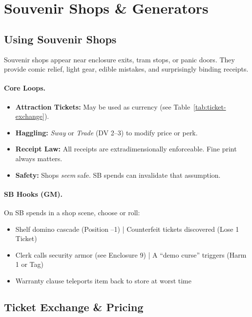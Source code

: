 \section{Souvenir Shops \& Generators}
\label{sec:souvenir-shops}

\subsection*{Using Souvenir Shops}
Souvenir shops appear near enclosure exits, tram stops, or panic doors. They provide comic relief, light gear, edible mistakes, and surprisingly binding receipts.

\paragraph{Core Loops.}
\begin{itemize}
  \item \textbf{Attraction Tickets:} May be used as currency (see Table~\ref{tab:ticket-exchange}).
  \item \textbf{Haggling:} \emph{Sway} or \emph{Trade} (DV 2--3) to modify price or perk.
  \item \textbf{Receipt Law:} All receipts are extradimensionally enforceable. Fine print always matters.
  \item \textbf{Safety:} Shops \emph{seem} safe. SB spends can invalidate that assumption.
\end{itemize}

\paragraph{SB Hooks (GM).}
On SB spends in a shop scene, choose or roll:
\begin{itemize}
  \item Shelf domino cascade (Position --1) \;|\; Counterfeit tickets discovered (Lose 1 Ticket)
  \item Clerk calls security armor (see Enclosure 9) \;|\; A ``demo curse'' triggers (Harm 1 or Tag)
  \item Warranty clause teleports item back to store at worst time
\end{itemize}

\subsection{Ticket Exchange \& Pricing}
\label{subsec:ticket-exchange}

